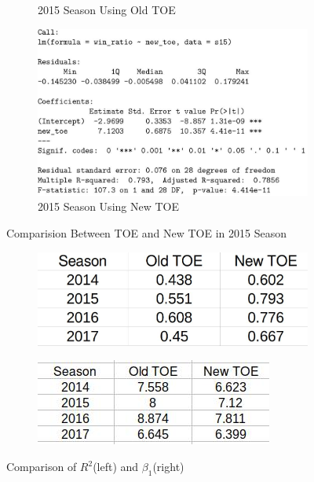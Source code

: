 \documentclass[11pt]{article}
\begin{document}
\begin{figure}[h!]
\begin{subfigure}[b]{0.42\linewidth}
    \caption{2015 Season Using Old TOE}
  \end{subfigure}
  \begin{subfigure}[b]{0.42\linewidth}
    \includegraphics[width=\linewidth]{15newSummary.jpg}
    \caption{2015 Season Using New TOE}
  \end{subfigure}
  \caption{Comparision Between TOE and New TOE in 2015 Season}
\end{figure}
\begin{figure}[h!]
\centering
 \begin{subfigure}[b]{0.4\linewidth}
  \includegraphics[width=\linewidth]{ComparisionR.jpg}
 \end{subfigure}
 \begin{subfigure}[b]{0.4\linewidth}
  \includegraphics[width =\linewidth]{Beta1.jpg}
\end{subfigure}
 \caption{Comparison of $R^2$(left) and $\beta_1$(right)}
\end{figure}
\end{document}
